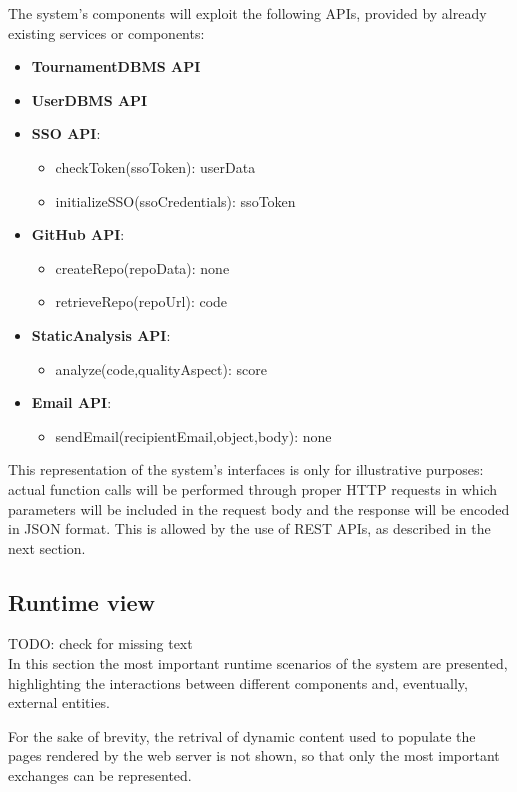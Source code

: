 The system's components will exploit the following APIs, provided by already existing services or components:
\begin{itemize}
    \item \textbf{TournamentDBMS API}
    \item \textbf{UserDBMS API}
    \item \textbf{SSO API}:
    \begin{itemize}
        \item checkToken(ssoToken): userData
        \item initializeSSO(ssoCredentials): ssoToken
    \end{itemize}
    \item \textbf{GitHub API}: 
    \begin{itemize}
        \item createRepo(repoData): none
        \item retrieveRepo(repoUrl): code
    \end{itemize}
    \item \textbf{StaticAnalysis API}: 
    \begin{itemize}
        \item analyze(code,qualityAspect): score
    \end{itemize}
    \item \textbf{Email API}:
    \begin{itemize}
        \item sendEmail(recipientEmail,object,body): none
    \end{itemize}
\end{itemize}
This representation of the system's interfaces is only for illustrative purposes: actual function calls will be performed through proper HTTP requests in which parameters will be included in the request body and the response will be encoded in JSON format. This is allowed by the use of REST APIs, as described in the next section.

\newpage
\subsection{Runtime view}
TODO: check for missing text\\
In this section the most important runtime scenarios of the system are presented, highlighting the interactions between different components and, eventually, external entities.

For the sake of brevity, the retrival of dynamic content used to populate the pages rendered by the web server is not shown, so that only the most important exchanges can be represented.

